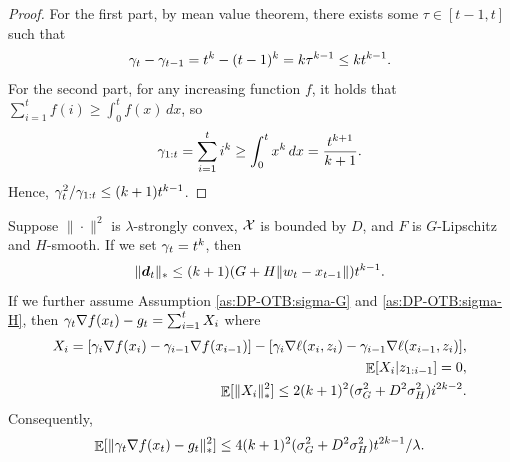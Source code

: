 \begin{proof}
For the first part, by mean value theorem, there exists some $\tau\in [t-1,t]$ such that
\begin{align*}
    \gamma_t - \gamma_{t-1} = t^k - (t-1)^k
    = k\tau^{k-1} \leq kt^{k-1}.
\end{align*}
For the second part, for any increasing function $f$, it holds that $\sum_{i=1}^t f(i) \geq \int_0^t f(x) \, dx$, so
\begin{align*}
    \gamma_{1:t} = \sum_{i=1}^t i^k \geq \int_0^t x^k \, dx = \frac{t^{k+1}}{k+1}.
\end{align*}
Hence, $\gamma_t^2/\gamma_{1:t} \leq (k+1)t^{k-1}$.
\end{proof}

\begin{lemma}
\label{lem:DP-OTB:variance-expectation-bound:detailed}
Suppose $\|\cdot\|^2$ is $\lambda$-strongly convex, ${\cal X}$ is bounded by $D$, and $F$ is $G$-Lipschitz and $H$-smooth. If we set $\gamma_t=t^k$, then
\begin{equation}
    \|{\boldsymbol{d}}_t\|_* \leq (k+1) (G+H\|w_t-x_{t-1}\|) t^{k-1}.
    \label{eq:app:DP-OTB:grad-diff-sens}
\end{equation}
If we further assume Assumption \ref{as:DP-OTB:sigma-G} and \ref{as:DP-OTB:sigma-H},
then $\gamma_t\nabla f(x_t)-g_t = \sum_{i=1}^tX_i$ where
\begin{align}
    X_i = [\gamma_i\nabla f(x_i)-\gamma_{i-1}\nabla f(x_{i-1})] - [\gamma_i\nabla\ell(x_i,z_i)-\gamma_{i-1}\nabla\ell(x_{i-1},z_i)], 
    \label{eq:app:DP-OTB:aux-1} \\
    \mathop{\mathbb{E}}[X_i|z_{1:i-1}]=0,
    \label{eq:app:DP-OTB:aux-2} \\
    \mathop{\mathbb{E}}[\|X_i\|_*^2] \leq 2(k+1)^2(\sigma_G^2+D^2\sigma_H^2)i^{2k-2}.
    \label{eq:app:DP-OTB:aux-3}
\end{align}
Consequently,
\begin{equation}
    \mathop{\mathbb{E}}[\|\gamma_t\nabla f(x_t)-g_t\|_*^2] \leq 4(k+1)^2(\sigma_G^2+D^2\sigma_H^2)t^{2k-1}/\lambda.
\end{equation}
\end{lemma}

